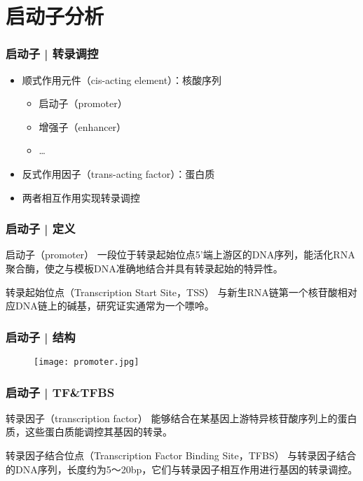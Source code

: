 \section{启动子分析}
\begin{frame}
  \frametitle{启动子 | 转录调控}
  \begin{itemize}
    \item 顺式作用元件（cis-acting element）：核酸序列
      \begin{itemize}
        \item 启动子（promoter）
        \item 增强子（enhancer）
        \item \ldots
      \end{itemize}
    \item 反式作用因子（trans-acting factor）：蛋白质
    \item 两者相互作用实现转录调控
  \end{itemize}
\end{frame}

\begin{frame}
  \frametitle{启动子 | 定义}
  \begin{block}{启动子（promoter）}
    一段位于转录起始位点5'端上游区的DNA序列，能活化RNA聚合酶，使之与模板DNA准确地结合并具有转录起始的特异性。
  \end{block}
  \pause
  \begin{block}{转录起始位点（Transcription Start Site，TSS）}
    与新生RNA链第一个核苷酸相对应DNA链上的碱基，研究证实通常为一个嘌呤。
  \end{block}
\end{frame}

\begin{frame}
  \frametitle{启动子 | 结构}
  \begin{figure}
    \centering
    \texttt{[image: promoter.jpg]}
  \end{figure}
\end{frame}

\begin{frame}
  \frametitle{启动子 | TF\&TFBS}
  \begin{block}{转录因子（transcription factor）}
    能够结合在某基因上游特异核苷酸序列上的蛋白质，这些蛋白质能调控其基因的转录。
  \end{block}
  \pause
  \begin{block}{转录因子结合位点（Transcription Factor Binding Site，TFBS）}
    与转录因子结合的DNA序列，长度约为5～20bp，它们与转录因子相互作用进行基因的转录调控。
  \end{block}
\end{frame}

